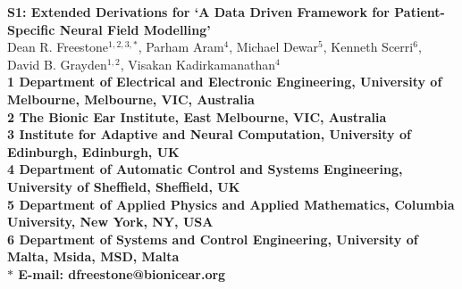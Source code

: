 \documentclass[]{article}
\begin{document}
	\begin{flushleft}
	{\Large
	\textbf{S1: Extended Derivations for `A Data Driven Framework for Patient-Specific Neural Field Modelling'}
	}
	\\
	Dean R. Freestone$^{1,2,3,\ast}$, 
	Parham Aram$^{4}$, 
	Michael Dewar$^{5}$,
	Kenneth Scerri$^{6}$,
	David B. Grayden$^{1,2}$,
	Visakan Kadirkamanathan$^{4}$
	\\
	\bf{1} Department of Electrical and Electronic Engineering, University of Melbourne, Melbourne, VIC, Australia
	\\
	\bf{2} The Bionic Ear Institute, East Melbourne, VIC, Australia
	\\
	\bf{3} Institute for Adaptive and Neural Computation, University of Edinburgh, Edinburgh, UK
	\\
	\bf{4} Department of Automatic Control and Systems Engineering, University of Sheffield, Sheffield, UK
	\\
	\bf{5} Department of Applied Physics and Applied Mathematics, Columbia University, New York, NY, USA
	\\
	\bf{6} Department of Systems and Control Engineering, University of Malta, Msida, MSD, Malta
	\\
	$\ast$ E-mail: dfreestone@bionicear.org
	\end{flushleft}


\ifpdf
{}
\else
{}
\fi

% 
% 
\renewcommand{\theequation}{S1.\arabic{equation}}
\end{document}
